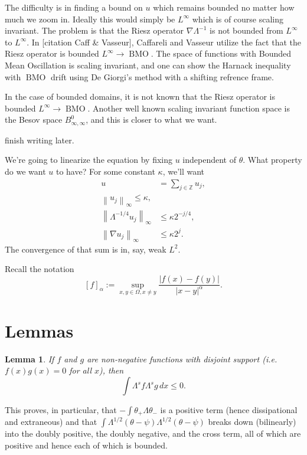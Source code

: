 \documentclass[11pt]{amsart}
\newtheorem{lemma}[theorem]{Lemma}
\theoremstyle{remark}
\theoremstyle{definition}
\newcommand{\Z}{\mathbb{Z}}
\newcommand{\norm}[1]{\left\lVert#1\right\rVert}
\newcommand{\bracket}[1]{\left[ #1 \right]}
\DeclareMathOperator{\BMO}{BMO}
\newcommand{\grad}{\nabla}
\begin{document}
The difficulty is in finding a bound on $u$ which remains bounded no matter how much we zoom in.  Ideally this would simply be $L^\infty$ which is of course scaling invariant.  The problem is that the Riesz operator $\grad \Lambda^{-1}$ is not bounded from $L^\infty$ to $L^\infty$.  In [citation Caff \& Vasseur], Caffareli and Vasseur utilize the fact that the Riesz operator is bounded $L^\infty \to \BMO$.  The space of functions with Bounded Mean Oscillation is scaling invariant, and one can show the Harnack inequality with $\BMO$ drift using De Giorgi's method with a shifting refrence frame.  

In the case of bounded domains, it is not known that the Riesz operator is bounded $L^\infty \to \BMO$.  Another well known scaling invariant function space is the Besov space $B^0_{\infty,\infty}$, and this is closer to what we want.  

finish writing later.  

We're going to linearize the equation by fixing $u$ independent of $\theta$.  What property do we want $u$ to have?  For some constant $\kappa$, we'll want
\begin{align*} 
u &= \sum_{j \in \Z} u_j, \\
\norm{u_j}_\infty \leq \kappa, \\
\norm{\Lambda^{-1/4} u_j}_\infty &\leq \kappa 2^{-j/4}, \\
\norm{\grad u_j}_\infty &\leq \kappa 2^j. 
\end{align*}
The convergence of that sum is in, say, weak $L^2$.  

Recall the notation
\[ \bracket{f}_\alpha := \sup_{x,y \in \Omega, x \neq y} \frac{|f(x)-f(y)|}{|x-y|^\alpha}. \]


\section{Lemmas}

\begin{lemma} \label{thm:disjoint}
If $f$ and $g$ are non-negative functions with disjoint support (i.e. $f(x)g(x) = 0$ for all $x$), then 
\[ \int \Lambda^s f \Lambda^s g \,dx \leq 0. \]
\end{lemma}

This proves, in particular, that $-\int \theta_+ \Lambda \theta_-$ is a positive term (hence dissipational and extraneous) and that $\int \Lambda^{1/2} (\theta-\psi) \Lambda^{1/2} (\theta-\psi)$ breaks down (bilinearly) into the doubly positive, the doubly negative, and the cross term, all of which are positive and hence each of which is bounded.  
\end{document}
